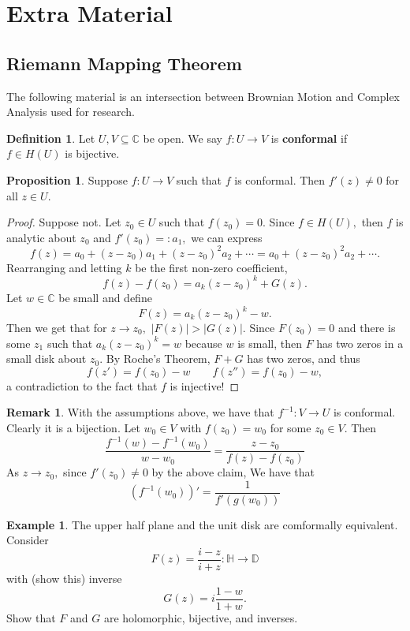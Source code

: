 \documentclass[10pt, oneside]{article}
\newcommand{\bbC}{\mathbb{C}}
\theoremstyle{definition}
\newtheorem{exmp}{Example}[section]
\newtheorem{defn}{Definition}
\newtheorem{prop}{Proposition}
\newtheorem{rem}{Remark}
\newcommand{\bbC}{\mathbb{C}}
\begin{document}
\section{Extra Material}
\subsection{Riemann Mapping Theorem}
The following material is an intersection between Brownian Motion and Complex Analysis used for research.
\begin{defn}
    Let $U,V \subseteq \bbC$ be open. We say $f: U \to V$ is \textbf{conformal} if $f \in H(U)$ is bijective.
\end{defn}
\begin{prop}
    Suppose $f: U \to V$ such that $f$ is conformal. Then $f'(z) \neq 0$ for all $z\in U.$
\end{prop}
\begin{proof}
    Suppose not. Let $z_0 \in U$ such that $f(z_0) = 0.$ Since $f \in H(U),$ then $f$ is analytic about $z_0$ and $f'(z_0) =: a_1,$  we can express
    \[f(z) = a_0 + (z - z_0) a_1 + (z-z_0)^2a_2 + \cdots  = a_0 + (z - z_0)^2 a_2 + \cdots.\] Rearranging and letting $k$ be the first non-zero coefficient,
    \[f(z) - f(z_0) = a_k(z - z_0)^k  + G(z).\] Let $w\in \bbC$ be small and define 
    \[F(z) =  a_k(z - z_0)^k - w.\] Then we get that for $z\to z_0,$ $|F(z)| > |G(z)|.$ Since $F(z_0) = 0$ and there is some $z_1$ such that $a_k(z - z_0)^k = w$ because $w$ is small, then $F$ has two zeros in a small disk about $z_0.$ By Roche's Theorem, $F + G$ has two zeros, and thus 
    \[f(z')  = f(z_0)  - w \qquad f(z'') = f(z_0) - w,\] a contradiction to the fact that $f$ is injective!
\end{proof}
\begin{rem}
    With the assumptions above, we have that $f^{-1}: V\to U$ is conformal. Clearly it is a bijection. Let $w_0 \in V$ with $f(z_0) = w_0$ for some $z_0 \in V.$ Then 
    \[\frac{f^{-1}(w)- f^{-1}(w_0)}{w - w_0} = \frac{z - z_0}{f(z) - f(z_0)}\] As $z\to z_0,$ since $f'(z_0) \neq 0$ by the above claim, We have that 
    \[(f^{-1}(w_0))' = \frac{1}{f'(g(w_0))}\]
\end{rem}
\begin{exmp}
    The upper half plane and the unit disk are comformally equivalent. Consider 
    \[F(z)= \frac{i-z}{i+z}: \mathbb{H}\to \mathbb{D}\] with (show this) inverse
    \[G(z) = i \frac{1-w}{1 + w}.\] Show that $F$ and $G$ are holomorphic, bijective, and inverses. 
\end{exmp}
\end{document}
